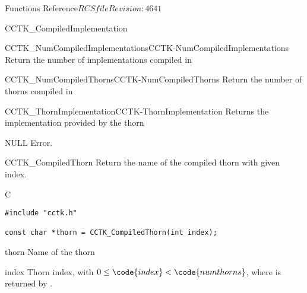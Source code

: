 \begin{cactuspart}{ Functions Reference}{$RCSfile$}{$Revision: 4641 $}
\begin{FunctionDescription}{CCTK\_CompiledImplementation}
\begin{SeeAlsoSection}
\begin{SeeAlso2}{CCTK\_NumCompiledImplementations}{CCTK-NumCompiledImplementations}
  Return the number of implementations compiled in
\end{SeeAlso2}
\begin{SeeAlso2}{CCTK\_NumCompiledThorns}{CCTK-NumCompiledThorns}
  Return the number of thorns compiled in
\end{SeeAlso2}
\begin{SeeAlso2}{CCTK\_ThornImplementation}{CCTK-ThornImplementation}
  Returns the implementation provided by the thorn
\end{SeeAlso2}
\end{SeeAlsoSection}

\begin{ErrorSection}
\begin{Error}{NULL}
Error.
\end{Error}
\end{ErrorSection}
\end{FunctionDescription}



\begin{FunctionDescription}{CCTK\_CompiledThorn}
\label{CCTK-CompiledThorn}
Return the name of the compiled thorn with given index.

\begin{SynopsisSection}
\begin{Synopsis}{C}
\begin{verbatim}
#include "cctk.h"

const char *thorn = CCTK_CompiledThorn(int index);
\end{verbatim}
\end{Synopsis}
\end{SynopsisSection}

\begin{ResultSection}
\begin{Result}{thorn}
Name of the thorn
\end{Result}
\end{ResultSection}

\begin{ParameterSection}
\begin{Parameter}{index}
Thorn index, with $0 \le \code{index} < \code{numthorns}$, where
 is returned by .
\end{Parameter}
\end{ParameterSection}


\end{FunctionDescription}
\end{cactuspart}
